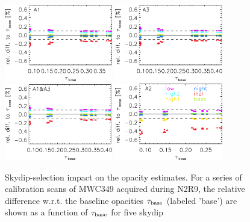 \begin{figure}[ht!]
  \begin{center}
    \includegraphics[clip=true, trim={0, -0.3cm, -0.3cm, 0},  width=0.42\textwidth]{Figures/Opacity/Skydip_selection_impact_a1.pdf}
    \includegraphics[clip=true, trim={0, -0.3cm, -0.3cm, 0},  width=0.42\textwidth]{Figures/Opacity/Skydip_selection_impact_a3.pdf}
    \includegraphics[clip=true, trim={0, -0.3cm, -0.3cm, 0},  width=0.42\textwidth]{Figures/Opacity/Skydip_selection_impact_1mm.pdf}
    \includegraphics[clip=true, trim={0, -0.3cm, -0.3cm, 0},  width=0.42\textwidth]{Figures/Opacity/Skydip_selection_impact_a2.pdf}
   \caption[Skydip selection impact on opacities]{Skydip-selection
    impact on the opacity estimates. For a series of calibration scans
    of MWC349 acquired during N2R9, the relative difference
    w.r.t. the baseline opacities $\tau_{\rm{base}}$ (labeled 'base')
    are shown as a function of $\tau_{\rm{base}}$ for five skydip
}
\end{center}
\end{figure}
